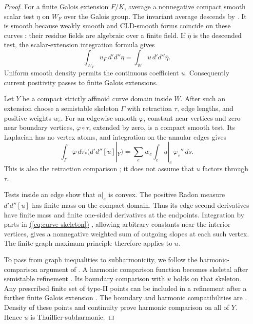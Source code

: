 \documentclass[11pt]{amsart}
\theoremstyle{definition}
\theoremstyle{remark}
\numberwithin{equation}{section}
\newcommand{\ddc}{d'd''}
\renewcommand{\eqref}[1]{%
 \begingroup\hypersetup{linkcolor=equationviolet}%
 \hyperref[#1]{\textup{(\ref*{#1})}}%
 \endgroup}
\begin{document}
\begin{proof}
For a finite Galois extension \(F/K\), average a nonnegative compact
smooth scalar test \(\eta\) on \(W_F\) over the Galois group.
The invariant average descends by
\cite[Proposition 14.2]{GJRforms}. It is smooth because weakly
smooth and CLD-smooth forms coincide on these curves
\cite[Remark 15.10]{GJRforms}: their residue fields are algebraic
over a finite field. If \(\overline\eta\) is the descended test,
the scalar-extension integration formula
\cite[Proposition 14.5]{GJRforms} gives
\[
 \int_{W_F}u_F\,\ddc\eta=\int_Wu\,\ddc\overline\eta.
\]
Uniform smooth density permits the continuous coefficient \(u\).
Consequently current positivity passes to finite Galois extensions.

Let \(Y\) be a compact strictly affinoid curve domain inside \(W\).
After such an extension choose a semistable skeleton \(\Gamma\)
with retraction \(\tau\), edge lengths, and positive weights \(w_e\).
For an edgewise smooth \(\varphi\), constant near vertices and zero
near boundary vertices, \(\varphi\circ\tau\), extended by zero,
is a compact smooth test. Its Laplacian has no vertex atoms, and
integration on the annular edges gives
\begin{equation}\label{eq:curve-skeleton}
 \int_\Gamma\varphi\,d\tau_*(\ddc[u]|_Y)
 =\sum_e w_e\int_e u|_e\,\varphi_e''\,ds.
\end{equation}
This is also the retraction comparison
\cite[Proposition 6.3.2]{GJRcurves}; it does not assume that \(u\)
factors through \(\tau\).

Tests inside an edge show that \(u|_e\) is convex. The positive
Radon measure \(\ddc[u]\) has finite mass on the compact domain.
Thus its edge second derivatives have finite mass and finite
one-sided derivatives at the endpoints. Integration by parts in
\eqref{eq:curve-skeleton}, allowing arbitrary constants near the
interior vertices, gives a nonnegative weighted sum of outgoing
slopes at each such vertex. The finite-graph maximum principle
therefore applies to \(u\).

To pass from graph inequalities to subharmonicity, we follow the
harmonic-comparison argument of \cite[Theorem 4.7]{Wanner}.
A harmonic comparison function becomes skeletal after semistable
refinement \cite[Section 15.6 and Proposition 15.7]{GJRforms}.
Its boundary comparison with \(u\) holds on that skeleton.
Any prescribed finite set of type-II points can be included in a
refinement after a further finite Galois extension
\cite[Remark 5.4.2]{GJRcurves}. The boundary and harmonic
compatibilities are \cite[Lemma 5.4.1 and Proposition 5.6.8]{GJRcurves}.
Density of these points and continuity prove harmonic comparison
on all of \(Y\). Hence \(u\) is Thuillier-subharmonic.


\end{proof}
\end{document}
